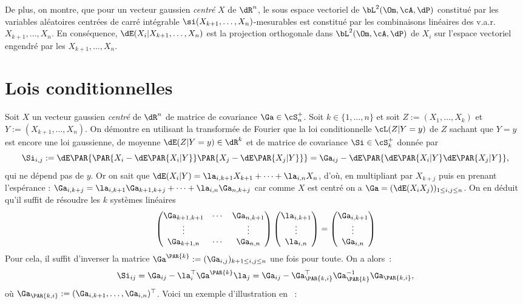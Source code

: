 {{De plus, on montre, que pour un vecteur gaussien \emph{centré} $X$ de $\dR^n$,
le sous espace vectoriel de $\bL^2(\Om,\cA,\dP)$ constitué par les variables
aléatoires centrées de carré intégrable $\si(X_{k+1},\ldots,X_n)$-mesurables
est constitué par les combinaisons linéaires des v.a.r. $X_{k+1},\ldots,X_n$.
En conséquence, $\dE(X_i\vert X_{k+1},\ldots,X_n)$ est la projection
orthogonale dans $\bL^2(\Om,\cA,\dP)$ de $X_i$ sur l'espace vectoriel engendré
par les $X_{k+1},\ldots,X_n$.

\section{Lois conditionnelles}

Soit $X$ un vecteur gaussien \emph{centré} de $\dR^n$ de matrice de covariance
$\Ga\in\cS_n^+$. Soit $k\in\{1,\ldots,n\}$ et soit $Z:=(X_1,\ldots,X_k)$ et
$Y:=(X_{k+1},\ldots,X_n)$. On démontre en utilisant la transformée de Fourier
que la loi conditionnelle $\cL(Z\vert Y=y)$ de $Z$ sachant que $Y=y$ est
encore une loi gaussienne, de moyenne $\dE(Z\vert Y=y)\in\dR^k$ et de matrice
de covariance $\Si\in\cS^+_k$ donnée par
$$
\Si_{i,j}:=\dE\PAR{\PAR{X_i-\dE\PAR{X_i\vert Y}}\PAR{X_j-\dE\PAR{X_j\vert
      Y}}} = \Ga_{ij}-\dE\PAR{\dE\PAR{X_i\vert Y}\dE\PAR{X_j\vert Y}},
$$
qui ne dépend pas de $y$. Or on sait que $\dE(X_i\vert Y)=\la_{i,k+1}
X_{k+1}+\cdots+\la_{i,n} X_n$, d'où, en multipliant par $X_{k+j}$ puis en
prenant l'espérance : $\Ga_{i,k+j}=\la_{i,k+1} \Ga_{k+1,k+j}+\cdots+\la_{i,n}
\Ga_{n,k+j}$ car comme $X$ est centré on a $\Ga=(\dE(X_i X_j))_{1\leq i,j \leq
  n}$. On en déduit qu'il suffit de résoudre les $k$ systèmes linéaires
$$
\begin{pmatrix} \Ga_{k+1,k+1} & \cdots & \Ga_{n,k+1} \\ 
                \vdots        &        & \vdots \\ 
                \Ga_{k+1,n}   & \cdots & \Ga_{n,n}
\end{pmatrix}
\begin{pmatrix} \la_{i,k+1} \\ \vdots \\ \la_{i,n}\end{pmatrix} 
=\begin{pmatrix} \Ga_{i,k+1} \\ \vdots \\ \Ga_{i,n}\end{pmatrix}
$$
Pour cela, il suffit d'inverser la matrice
$\Ga^{\PAR{k}}:=(\Ga_{i,j})_{k+1\leq i,j \leq n}$ une fois pour toute. On a
alors~:
$$
\Si_{ij}=\Ga_{ij}-\la_i^\top\Ga^\PAR{k}\la_j
        =\Ga_{ij}-\Ga_\PAR{k,i}^\top \Ga_\PAR{k}^{-1} \Ga_\PAR{k,i},
$$
où $\Ga_\PAR{k,i}:=(\Ga_{i,k+1},\ldots,\Ga_{i,n})^\top$. Voici un
exemple d'illustration en \ML{}~:
%
%
%

}}
